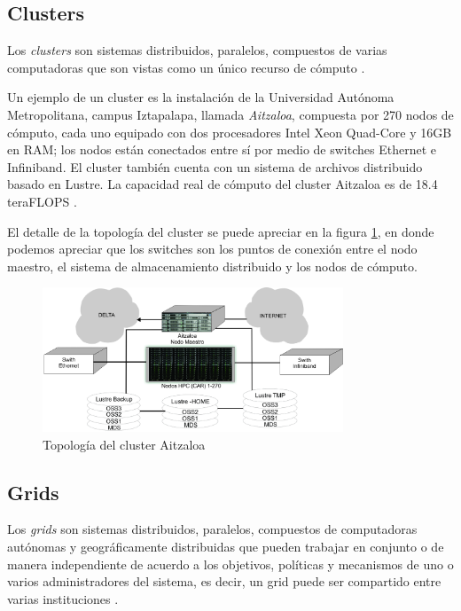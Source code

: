 \documentclass[letterpaper, 12pt]{report}
\begin{document}
\subsection{Clusters}
Los \emph{clusters} son sistemas distribuidos, paralelos, compuestos de varias computadoras que son vistas como un único recurso de cómputo \cite{buyya2009cloud}. 

Un ejemplo de un cluster es la instalación de la Universidad Autónoma Metropolitana, campus Iztapalapa, llamada \emph{Aitzaloa}, compuesta por 270 nodos de cómputo, cada uno equipado con dos procesadores Intel Xeon Quad-Core y 16GB en RAM; los nodos están conectados entre sí por medio de switches Ethernet e Infiniband. El cluster también cuenta con un sistema de archivos distribuido basado en Lustre. La capacidad real de cómputo del cluster Aitzaloa es de 18.4 teraFLOPS \cite{uamz2013tizaloa}.

El detalle de la topología del cluster se puede apreciar en la figura \ref{fig:topologia_aitzaloa}, en donde podemos apreciar que los switches son los puntos de conexión entre el nodo maestro, el sistema de almacenamiento distribuido y los nodos de cómputo.

\begin{figure}
    \begin{center}
        \includegraphics[width=0.8\textwidth]{imagenes/topologia_aitzaloa}
    \end{center}
    \caption{Topología del cluster Aitzaloa}
    \label{fig:topologia_aitzaloa}
\end{figure}


\subsection{Grids}
Los \emph{grids} son sistemas distribuidos, paralelos, compuestos de computadoras autónomas y geográficamente distribuidas que pueden trabajar en conjunto o de manera independiente de acuerdo a los objetivos, políticas y mecanismos de uno o varios administradores del sistema, es decir, un grid puede ser compartido entre varias instituciones \cite{buyya2009cloud}. 
\end{document}
